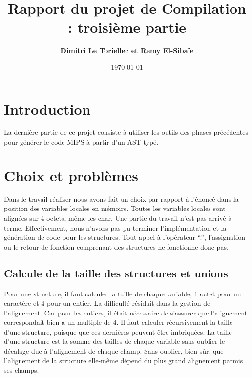 \documentclass[a4paper]{report} \usepackage[utf8]{inputenc}
\title{\bf Rapport du projet de Compilation : troisième partie}
\author{\bf Dimitri Le Toriellec et Remy El-Sibaïe} \date{\today}
\begin{document}
	\maketitle 




\section*{Introduction}


La dernière partie de ce projet consiste à utiliser les outils des phases précédentes pour générer le code MIPS à partir d’un AST typé. 


\section{Choix et problèmes}

Dans le travail réaliser nous avons fait un choix par rapport à l’énoncé dans la position des variables locales en mémoire. Toutes les variables locales sont alignées sur 4 octets, même les char. 
        Une partie du travail n’est pas arrivé à terme. Effectivement, nous n’avons pas pu terminer l’implémentation et la génération de code pour les structures. Tout appel à l’opérateur “.”, l’assignation ou le retour de fonction comprenant des structures ne fonctionne donc pas.



\subsection{Calcule de la taille des structures et unions}


Pour une structure, il faut calculer la taille de chaque variable, 1 octet pour un caractère et 4 pour un entier. La difficulté résidait dans la gestion de l'alignement. Car pour les entiers, il était nécessaire de s’assurer que l'alignement correspondait bien à un multiple de 4. Il faut calculer récursivement la taille d’une structure, puisque que ces dernières peuvent être imbriquées. La taille d’une structure est la somme des tailles de chaque variable sans oublier le décalage due à l’alignement de chaque champ. Sans oublier, bien sûr, que l’alignement de la structure elle-même dépend du plus grand alignement  parmis ses champs. 
\end{document}
